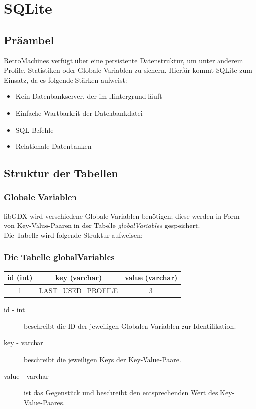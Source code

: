 \documentclass[11pt,a4paper]{report}
\begin{document}
\section{SQLite}

\subsection{Präambel}

RetroMachines verfügt über eine persistente Datenstruktur, um unter anderem Profile, Statistiken oder Globale Variablen zu sichern. Hierfür kommt SQLite zum Einsatz, da es folgende Stärken aufweist:

\begin{itemize}
	\item Kein Datenbankserver, der im Hintergrund läuft
	\item Einfache Wartbarkeit der Datenbankdatei
	\item SQL-Befehle
	\item Relationale Datenbanken
\end{itemize}

\subsection{Struktur der Tabellen}

\subsubsection{Globale Variablen}

libGDX wird verschiedene Globale Variablen benötigen; diese werden in Form von Key-Value-Paaren in der Tabelle \textit{globalVariables} gespeichert. \\ 
Die Tabelle wird folgende Struktur aufweisen:

{\center
\subsubsection*{Die Tabelle globalVariables}
\begin{tabular}{ccc}
	\hline
	id (int) & key (varchar) & value (varchar) \\
	\hline
	1 & LAST\_USED\_PROFILE & 3 \\
	\hline
\end{tabular}
\par
}

\begin{description}
	\item[id - int] beschreibt die ID der jeweiligen Globalen Variablen zur Identifikation.
	\item[key - varchar] beschreibt die jeweiligen Keys der Key-Value-Paare.
	\item[value - varchar] ist das Gegenstück und beschreibt den entsprechenden Wert des Key-Value-Paares.
\end{description}
\end{document}
